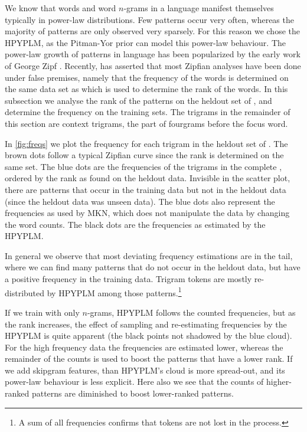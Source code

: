 We know that words and word $n$-grams in a language manifest themselves typically in power-law distributions. Few patterns occur very often, whereas the majority of patterns are only observed very sparsely. For this reason we chose the HPYPLM, as the Pitman-Yor prior can model this power-law behaviour. The power-law growth of patterns in language has been popularized by the early work of George Zipf \autocite{Zipf35,Zipf49}. Recently, \autocite{piantadosi2014Zipfs} has asserted that most Zipfian analyses have been done under false premises, namely that the frequency of the words is determined on the same data set as which is used to determine the rank of the words. In this subsection we analyse the rank of the patterns on the heldout set of \obw, and determine the frequency on the training sets. The trigrams in the remainder of this section are context trigrams, the part of fourgrams before the focus word.

In \cref{fig:freqs} we plot the frequency for each trigram in the heldout set of \obw. The brown dots
follow a typical Zipfian curve since the rank is determined on the same set. The blue dots are the frequencies of the trigrams in the complete \obw, ordered by the rank as found on the heldout data. Invisible in the scatter plot, there are patterns that occur in the training data but not in the heldout data (since the heldout data was unseen data).
The blue dots also represent the frequencies as used by MKN, which does not manipulate the data by changing the word counts. The black dots are the frequencies as estimated by the HPYPLM. 

In general we observe that most deviating frequency estimations are in the tail, where we can find many patterns that do not occur in the heldout data, but have a positive frequency in the training data. Trigram tokens are mostly re-distributed by HPYPLM among those patterns.\footnote{A sum of all frequencies confirms that tokens are not lost in the process.}

If we train with only $n$-grams, HPYPLM follows the counted frequencies, but as the rank increases, the effect of sampling and re-estimating frequencies by the HPYPLM is quite apparent (the black points not shadowed by the blue cloud). For the high frequency data the frequencies are estimated lower, whereas the remainder of the counts is used to boost the patterns that have a lower rank. If we add skipgram features, than HPYPLM's cloud is more spread-out, and its power-law behaviour is less explicit. Here also we see that the counts of higher-ranked patterns are diminished to boost lower-ranked patterns.

